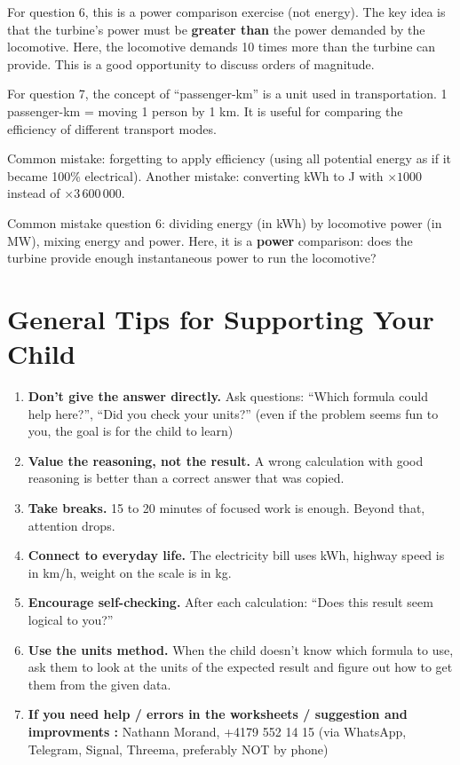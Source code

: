 \documentclass[11pt,a4paper]{article}
\newcommand{\tipbox}[1]{
\begin{tcolorbox}[colback=tipblue!8!white,colframe=tipblue!60!black,title=\textbf{How to explain}]
#1
\end{tcolorbox}
}
\newcommand{\warnbox}[1]{
\begin{tcolorbox}[colback=warnred!8!white,colframe=warnred!60!black,title=\textbf{Common mistakes}]
#1
\end{tcolorbox}
}
\begin{document}
\tipbox{
For question 6, this is a power comparison exercise (not energy). The key idea is that the turbine's power must be \textbf{greater than} the power demanded by the locomotive. Here, the locomotive demands 10 times more than the turbine can provide. This is a good opportunity to discuss orders of magnitude.

\vspace{0.2cm}
For question 7, the concept of ``passenger-km'' is a unit used in transportation. 1 passenger-km = moving 1 person by 1 km. It is useful for comparing the efficiency of different transport modes.
}

\warnbox{
Common mistake: forgetting to apply efficiency (using all potential energy as if it became 100\% electrical). Another mistake: converting kWh to J with $\times 1000$ instead of $\times 3\,600\,000$.

\vspace{0.2cm}
Common mistake question 6: dividing energy (in kWh) by locomotive power (in MW), mixing energy and power. Here, it is a \textbf{power} comparison: does the turbine provide enough instantaneous power to run the locomotive?
}

\section*{General Tips for Supporting Your Child}

\begin{enumerate}
\item \textbf{Don't give the answer directly.} Ask questions: ``Which formula could help here?'', ``Did you check your units?'' (even if the problem seems fun to you, the goal is for the child to learn)
\item \textbf{Value the reasoning, not the result.} A wrong calculation with good reasoning is better than a correct answer that was copied.
\item \textbf{Take breaks.} 15 to 20 minutes of focused work is enough. Beyond that, attention drops.
\item \textbf{Connect to everyday life.} The electricity bill uses kWh, highway speed is in km/h, weight on the scale is in kg.
\item \textbf{Encourage self-checking.} After each calculation: ``Does this result seem logical to you?''
\item \textbf{Use the units method.} When the child doesn't know which formula to use, ask them to look at the units of the expected result and figure out how to get them from the given data.
\item \textbf{If you need help / errors in the worksheets / suggestion and improvments :} Nathann Morand, +4179 552 14 15 (via WhatsApp, Telegram, Signal, Threema, preferably NOT by phone)
\end{enumerate}
\end{document}
